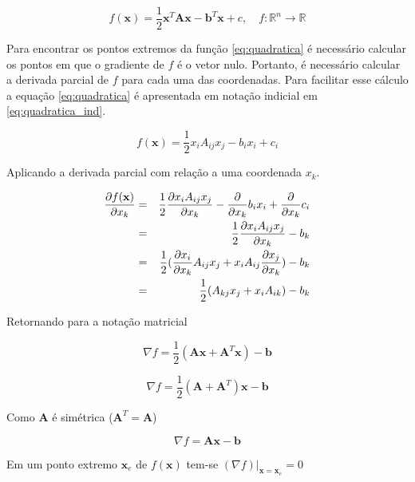 \begin{equation} \label{eq:quadratica}
    f(\mathbf{x}) = \frac{1}{2}  \mathbf{x}^T \mathbf{A} \mathbf{x} - \mathbf{b}^T \mathbf{x} + c, \quad f:\mathbb{R}^n \rightarrow \mathbb{R}
\end{equation}

Para encontrar os pontos extremos da função \eqref{eq:quadratica} é necessário calcular os pontos em que o gradiente de $f$ é o vetor nulo. Portanto, é necessário calcular a derivada parcial de $f$ para cada uma das coordenadas. Para facilitar esse cálculo a equação \eqref{eq:quadratica} é apresentada em notação indicial em \eqref{eq:quadratica_ind}.


\begin{equation} \label{eq:quadratica_ind}
    f(\mathbf{x}) = \frac{1}{2} x_i A_{ij} x_j - b_i x_i + c_i
\end{equation}


Aplicando a derivada parcial com relação a uma coordenada $x_k$.


\begin{eqnarray}
     \dxk[f(\mathbf{x})] & = & \frac{1}{2} \dxk[ x_i A_{ij} x_j ]- \dxk{b_i x_i}+ \dxk{c_i} \\
                & = & \frac{1}{2} \dxk[ x_i A_{ij} x_j ]- b_k \\
                & = & \frac{1}{2} (\dxk[ x_i ]A_{ij} x_j  + x_i A_{ij} \dxk[x_j]) - b_k \\
                & = & \frac{1}{2}(A_{kj} x_j  + x_i A_{ik})  - b_k
\end{eqnarray}


Retornando para a notação matricial


\begin{equation}
    \nabla f = \frac{1}{2} (\mathbf{A}\mathbf{x} + \mathbf{A}^T \mathbf{x}) - \mathbf{b}
\end{equation}


\begin{equation}
    \nabla f = \frac{1}{2} (\mathbf{A} + \mathbf{A}^T) \mathbf{x} - \mathbf{b}
\end{equation}

Como $\mathbf{A}$ é simétrica ($\mathbf{A}^T = \mathbf{A}$)

\begin{equation} \label{eq:gradf}
    \nabla f = \mathbf{A} \mathbf{x} - \mathbf{b}
\end{equation}

Em um ponto extremo  $ \mathbf{x}_e$ de $f(\mathbf{x})$ tem-se $(\nabla f)|_{\mathbf{x}=\mathbf{x}_e} = 0 $


